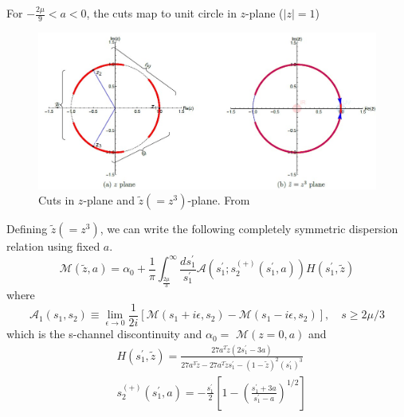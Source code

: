 ﻿\documentclass[12pt,a4paper]{article}
\begin{document}
For $-\frac{2\mu}{9}<a<0$, the cuts map to unit circle in $z$-plane ($|z|=1$)
\begin{figure}[H]
  \centering
  \includegraphics[width=\linewidth]{16.jpg}
  \caption{Cuts in $z$-plane and $\tilde z (=z^{3})$-plane. From \cite{10}}
  \label{fig:1}
\end{figure}
Defining $\tilde z (=z^{3})$, we can write the following completely symmetric dispersion relation using fixed $a$.
$$
\mathcal{M}(\tilde{z}, a)=\alpha_{0}+\frac{1}{\pi} \int_{\frac{2 \mu}{3}}^{\infty} \frac{d s_{1}^{\prime}}{s_{1}^{\prime}} \mathcal{A}\left(s_{1}^{\prime} ; s_{2}^{(+)}\left(s_{1}^{\prime}, a\right)\right) H\left(s_{1}^{\prime}, \tilde{z}\right)
$$
where 
$$
\mathcal{A}_{1}\left(s_{1}, s_{2}\right) \equiv \lim _{\epsilon \rightarrow 0} \frac{1}{2 i}\left[\mathcal{M}\left(s_{1}+i \epsilon, s_{2}\right)-\mathcal{M}\left(s_{1}-i \epsilon, s_{2}\right)\right], \quad s \geqslant 2 \mu / 3
$$
which is the s-channel discontinuity and $\alpha_{0}=$ $\mathcal{M}(z=0, a)$ and
$$
\begin{aligned}
&H\left(s_{1}^{\prime}, \tilde{z}\right)=\frac{27 a^{2} \tilde{z}\left(2 s_{1}^{\prime}-3 a\right)}{27 a^{3} \tilde{z}-27 a^{2} \tilde{z} s_{1}^{\prime}-(1-\tilde{z})^{2}\left(s_{1}^{\prime}\right)^{3}} \\
&s_{2}^{(+)}\left(s_{1}^{\prime}, a\right)=-\frac{s_{1}^{\prime}}{2}\left[1-\left(\frac{s_{1}^{\prime}+3 a}{s_{1}^{\prime}-a}\right)^{1 / 2}\right]
\end{aligned}
$$
\end{document}
